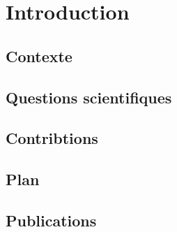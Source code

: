 

\chapter{Introduction}

\minitoc

\section{Contexte}

\section{Questions scientifiques}

\section{Contribtions}

\section{Plan}

\section{Publications}

% 
% 
% 